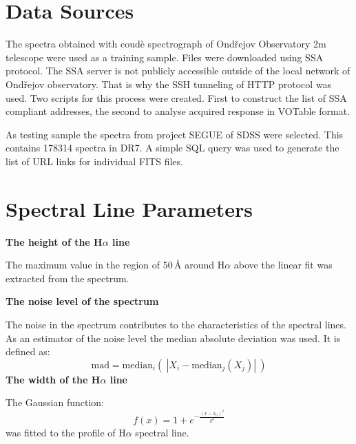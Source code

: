 \documentclass[11pt,twoside]{article}
\begin{document}
\section{Data Sources}
The spectra obtained with coud\`e spectrograph of Ond\v{r}ejov
Observatory 2m telescope were used as a training sample. Files were
downloaded using SSA protocol. The SSA server is not publicly
accessible outside of the local network of Ond\v{r}ejov observatory.
That is why the SSH tunneling of HTTP protocol was used. Two scripts
for this process were created. First to construct the list of SSA
compliant addresses, the second to analyse acquired response in
VOTable format.

As testing sample the spectra from project SEGUE of SDSS were
selected. This contains 178314 spectra in DR7. A simple SQL query was
used to generate the list of URL links for individual FITS
files. 

\section{Spectral Line Parameters}

\textbf{The height of the H$\alpha$ line}

The maximum value in the region of $50\,\textrm{\AA}$ around H$\alpha$
above the linear fit was extracted from the spectrum.

\textbf{The noise level of the spectrum}

The noise in the spectrum contributes to the characteristics of the
spectral lines. As an estimator of the noise level the median
absolute deviation was used. It is defined as:
%
\begin{equation}
  \textrm{mad} = \textrm{median}_{i}\left(\ \left| X_{i} -
      \textrm{median}_{j} (X_{j}) \right|\ \right)
\end{equation}
%
\textbf{The width of the H$\alpha$ line}

The Gaussian function:
%
\begin{equation}
  \label{eq:gauss2}
  f(x) =  1 + e^{- { \frac{(x-x_0)^2 }{ S^2} } }
\end{equation}
%
was fitted to the profile of H$\alpha$ spectral line. 
%
%
\end{document}
